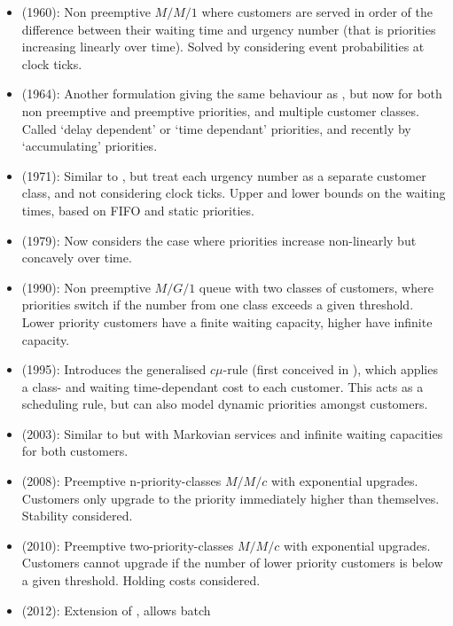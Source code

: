 \documentclass{article}
\begin{document}
\begin{itemize}
  \item \cite{jackson60} (1960): Non preemptive $M/M/1$ where customers
      are served in order of the difference between their waiting time
        and urgency number (that is priorities increasing linearly over
        time). Solved by considering event probabilities at clock ticks.
  \item \cite{kleinrock164} (1964): Another formulation giving the same
      behaviour as \cite{jackson60}, but now for both non preemptive and
        preemptive priorities, and multiple customer classes. Called `delay
        dependent' or `time dependant' priorities, and recently by
        `accumulating' priorities.
  \item \cite{holtzman71} (1971): Similar to \cite{jackson60}, but treat each
      urgency number as a separate customer class, and not considering
        clock ticks. Upper and lower bounds on the waiting times, based
        on FIFO and static priorities.
  \item \cite{netterman79} (1979): Now considers the case where
      priorities increase non-linearly but concavely over time.
  \item \cite{fratini90} (1990): Non preemptive $M/G/1$ queue with two
      classes of customers, where priorities switch if the number from
        one class exceeds a given threshold. Lower priority customers
        have a finite waiting capacity, higher have infinite capacity.
  \item \cite{vanmieghan95} (1995): Introduces the generalised $c\mu$-rule
    (first conceived in \cite{smith56}), which applies a class- and waiting
      time-dependant cost to each customer. This acts as a scheduling rule,
      but can also model dynamic priorities amongst customers.
  \item \cite{knessl03} (2003): Similar to \cite{fratini90} but with Markovian
      services and infinite waiting capacities for both customers.
  \item \cite{xie08} (2008): Preemptive n-priority-classes $M/M/c$ with
      exponential upgrades. Customers only upgrade to the priority
        immediately higher than themselves. Stability considered.
  \item \cite{down10} (2010): Preemptive two-priority-classes $M/M/c$ with
      exponential upgrades. Customers cannot upgrade if the number of
        lower priority customers is below a given threshold. Holding
        costs considered.
  \item \cite{he12} (2012): Extension of \cite{down10}, allows batch

\end{itemize}
\end{document}
